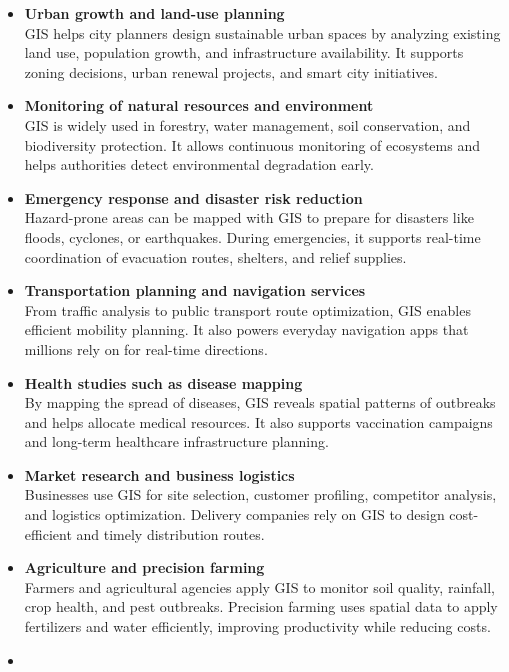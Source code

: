 \documentclass[
  11pt,
  letterpaper,
]{book}
\begin{document}
\begin{itemize}
\item
  \textbf{Urban growth and land-use planning}\\
  GIS helps city planners design sustainable urban spaces by analyzing
  existing land use, population growth, and infrastructure availability.
  It supports zoning decisions, urban renewal projects, and smart city
  initiatives.
\item
  \textbf{Monitoring of natural resources and environment}\\
  GIS is widely used in forestry, water management, soil conservation,
  and biodiversity protection. It allows continuous monitoring of
  ecosystems and helps authorities detect environmental degradation
  early.
\item
  \textbf{Emergency response and disaster risk reduction}\\
  Hazard-prone areas can be mapped with GIS to prepare for disasters
  like floods, cyclones, or earthquakes. During emergencies, it supports
  real-time coordination of evacuation routes, shelters, and relief
  supplies.
\item
  \textbf{Transportation planning and navigation services}\\
  From traffic analysis to public transport route optimization, GIS
  enables efficient mobility planning. It also powers everyday
  navigation apps that millions rely on for real-time directions.
\item
  \textbf{Health studies such as disease mapping}\\
  By mapping the spread of diseases, GIS reveals spatial patterns of
  outbreaks and helps allocate medical resources. It also supports
  vaccination campaigns and long-term healthcare infrastructure
  planning.
\item
  \textbf{Market research and business logistics}\\
  Businesses use GIS for site selection, customer profiling, competitor
  analysis, and logistics optimization. Delivery companies rely on GIS
  to design cost-efficient and timely distribution routes.
\item
  \textbf{Agriculture and precision farming}\\
  Farmers and agricultural agencies apply GIS to monitor soil quality,
  rainfall, crop health, and pest outbreaks. Precision farming uses
  spatial data to apply fertilizers and water efficiently, improving
  productivity while reducing costs.
\item

\end{itemize}
\end{document}

